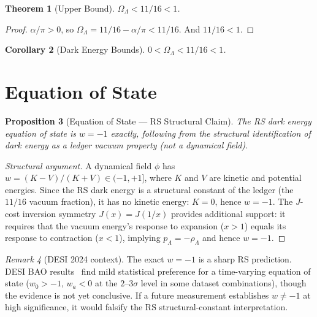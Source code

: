 \documentclass[12pt,a4paper]{article}
\newtheorem{theorem}{Theorem}[section]
\newtheorem{corollary}[theorem]{Corollary}
\newtheorem{proposition}[theorem]{Proposition}
\theoremstyle{definition}
\theoremstyle{remark}
\newtheorem{remark}[theorem]{Remark}
\begin{document}
\begin{theorem}[Upper Bound]
$\Omega_\Lambda < 11/16 < 1$.
\end{theorem}

\begin{proof}
$\alpha/\pi > 0$, so $\Omega_\Lambda = 11/16 - \alpha/\pi < 11/16$.
And $11/16 < 1$.
\end{proof}

\begin{corollary}[Dark Energy Bounds]
$0 < \Omega_\Lambda < 11/16 < 1$.
\end{corollary}

\section{Equation of State}
\label{sec:eos}

\begin{proposition}[Equation of State --- RS Structural Claim]
\label{thm:eos}
The RS dark energy equation of state is $w = -1$ exactly, following
from the structural identification of dark energy as a ledger vacuum
property (not a dynamical field).
\end{proposition}

\begin{proof}[Structural argument]
A dynamical field $\phi$ has $w = (K - V)/(K + V) \in (-1, +1]$,
where $K$ and $V$ are kinetic and potential energies.  Since the RS
dark energy is a structural constant of the ledger (the $11/16$
vacuum fraction), it has no kinetic energy: $K = 0$, hence $w = -1$.
The $J$-cost inversion symmetry $J(x) = J(1/x)$ provides additional
support: it requires that the vacuum energy's response to expansion
($x > 1$) equals its response to contraction ($x < 1$), implying
$p_\Lambda = -\rho_\Lambda$ and hence $w = -1$.
\end{proof}

\begin{remark}[DESI 2024 context]
\label{rem:desi}
The exact $w = -1$ is a sharp RS prediction.  DESI BAO
results~\cite{DESI2024} find mild statistical preference for a
time-varying equation of state ($w_0 > -1$, $w_a < 0$ at the
$2$--$3\sigma$ level in some dataset combinations), though the
evidence is not yet conclusive.  If a future measurement establishes
$w \neq -1$ at high significance, it would falsify the RS
structural-constant interpretation.
\end{remark}
\end{document}
